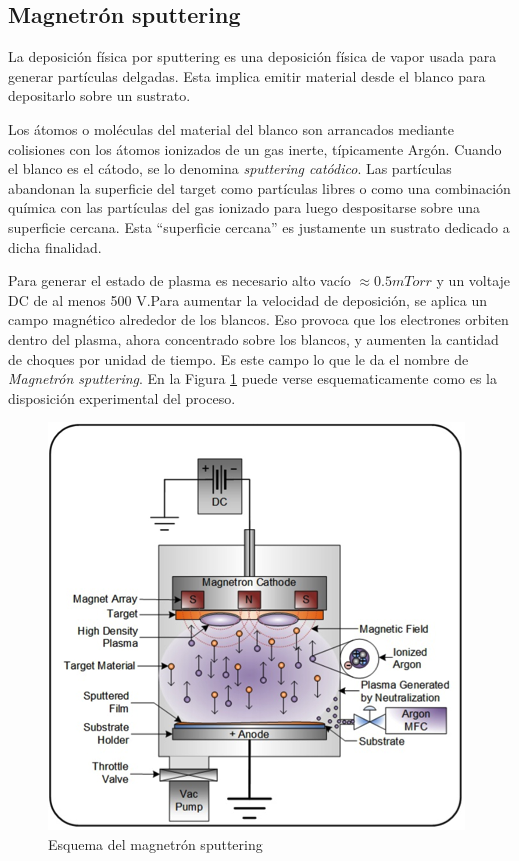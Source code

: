 \documentclass[12pt]{article}
\theoremstyle{definition}
\theoremstyle{remark}
\begin{document}
\subsection{Magnetrón sputtering}
La deposición física por sputtering es una deposición física de vapor usada para generar partículas delgadas. Esta implica emitir material desde el blanco para depositarlo sobre un sustrato. 

 Los átomos o moléculas del material del blanco son arrancados mediante colisiones con los átomos ionizados de un gas inerte, típicamente Argón. Cuando el blanco es el cátodo, se lo denomina \textit{sputtering catódico}. Las partículas abandonan la superficie del target como partículas libres o como una combinación química con las partículas del gas ionizado para luego despositarse sobre una superficie cercana.  Esta ``superficie cercana'' es justamente un sustrato dedicado a dicha finalidad.
 
Para generar el estado de plasma es necesario alto vacío $\approx 0.5 mTorr$ y un voltaje DC de al menos 500 V.Para aumentar la velocidad de deposición, se aplica un campo magnético alrededor de los blancos. Eso provoca que los electrones orbiten dentro del plasma, ahora concentrado sobre los blancos, y aumenten la cantidad de choques por unidad de tiempo. Es este campo lo que le da el nombre de \textit{Magnetrón sputtering}\citep{Malvasio}\citep{ThinFilm}. En la Figura \ref{sputter} puede verse esquematicamente como es la disposición experimental del proceso.

\begin{figure}[H]
	\centering
	\includegraphics[scale=0.8]{img/diagram-dc-magnatron.png}
	\caption{Esquema del magnetrón sputtering}
	\label{sputter}
\end{figure}
\end{document}
